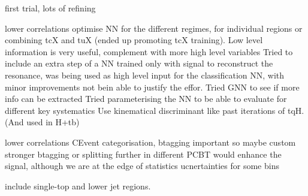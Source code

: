 first trial, lots of refining

lower correlations
optimise NN for the different regimes, for individual regions or combining tcX and tuX (ended up promoting tcX training). Low level information is very useful, complement with more high level variables
Tried to include an extra step of a NN trained only with signal to reconstruct the resonance, was being used as high level input for the classification NN, with minor improvements not bein able to justify the effor. Tried GNN to see if more info can be extracted
Tried parameterising the NN to be able to evaluate for different key systematics
Use kinematical discriminant like past iterations of tqH. (And used in H+tb)

lower correlations
CEvent categorisation, btagging important so maybe custom stronger btagging or splitting further in different PCBT would enhance the signal, although we are at the edge of statistics ucnertainties for some bins

include single-top and lower jet regions.